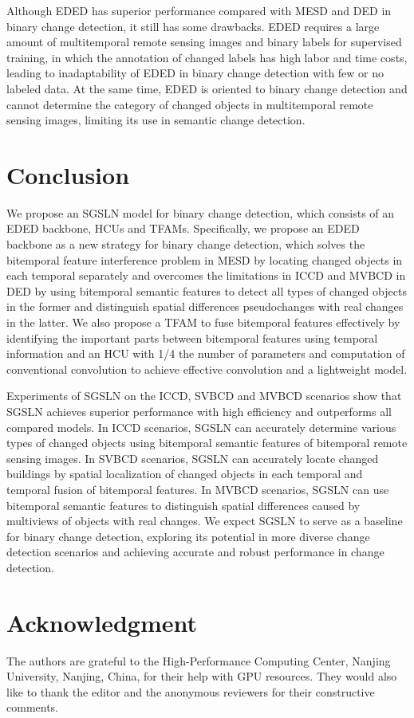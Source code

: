 \documentclass[journal]{IEEEtran}
\begin{document}
Although EDED has superior performance compared with MESD and DED in binary change detection, it still has some drawbacks. EDED requires a large amount of multitemporal remote sensing images and binary labels for supervised training, in which the annotation of changed labels has high labor and time costs, leading to inadaptability of EDED in binary change detection with few or no labeled data. At the same time, EDED is oriented to binary change detection and cannot determine the category of changed objects in multitemporal remote sensing images, limiting its use in semantic change detection.

\section{Conclusion}

We propose an SGSLN model for binary change detection, which consists of an EDED backbone, HCUs and TFAMs. Specifically, we propose an EDED backbone as a new strategy for binary change detection, which solves the bitemporal feature interference problem in MESD by locating changed objects in each temporal separately and overcomes the limitations in ICCD and MVBCD in DED by using bitemporal semantic features to detect all types of changed objects in the former and distinguish spatial differences pseudochanges with real changes in the latter. We also propose a TFAM to fuse bitemporal features effectively by identifying the important parts between bitemporal features using temporal information and an HCU with 1/4 the number of parameters and computation of conventional convolution to achieve effective convolution and a lightweight model.

Experiments of SGSLN on the ICCD, SVBCD and MVBCD scenarios show that SGSLN achieves superior performance with high efficiency and outperforms all compared models. In ICCD scenarios, SGSLN can accurately determine various types of changed objects using bitemporal semantic features of bitemporal remote sensing images. In SVBCD scenarios, SGSLN can accurately locate changed buildings by spatial localization of changed objects in each temporal and temporal fusion of bitemporal features. In MVBCD scenarios, SGSLN can use bitemporal semantic features to distinguish spatial differences caused by multiviews of objects with real changes. We expect SGSLN to serve as a baseline for binary change detection, exploring its potential in more diverse change detection scenarios and achieving accurate and robust performance in change detection.

\section*{Acknowledgment}
The authors are grateful to the High-Performance Computing Center, Nanjing University, Nanjing, China, for their help with GPU resources. They would also like to thank the editor and the anonymous reviewers for their constructive comments.

\ifCLASSOPTIONcaptionsoff
  \newpage
\fi



\end{document}
